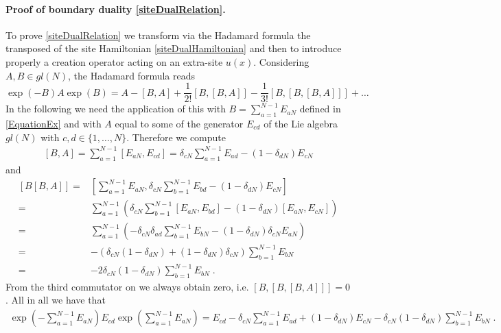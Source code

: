 \documentclass[10pt]{article}
\numberwithin{equation}{section}
\numberwithin{equation}{subsection}
\newcommand{\dt}{\;.}
\begin{document}
 \paragraph{Proof of boundary duality \eqref{siteDualRelation}.} To prove \eqref{siteDualRelation} we transform via the Hadamard formula the transposed of the site Hamiltonian \eqref{siteDualHamiltonian} and then to  introduce properly a creation operator acting on an extra-site $u(x)$. %
 Considering $A,B\in {gl}(N)$, the Hadamard formula reads 
 \begin{equation}\label{HadamardFormula}
     \exp{(-B)}A\exp{(B)}=A-\left[B,A\right]+\frac{1}{2!}\left[B,\left[B,A\right]\right]-\frac{1}{3!}\left[B,\left[B,\left[B,A\right]\right]\right]+\ldots
 \end{equation}
In the following we need the application of this with $B=\sum_{a=1}^{N-1}E_{aN}$ defined in \eqref{EquationEx} and with $A$ equal to some of the generator $E_{cd}$ of the Lie algebra ${gl}(N)$ with $c,d\in\{1,\ldots,N\}$. Therefore we compute 
\begin{align}
	\left[B,A\right]=\sum_{a=1}^{N-1}\left[E_{aN},E_{cd}\right]=\delta_{cN}\sum_{a=1}^{N-1}E_{ad}-(1-\delta_{dN})E_{cN}
\end{align}
and 
\begin{align}
	\left[B\left[B,A\right]\right]=&\left[\sum_{a=1}^{N-1}E_{aN},\delta_{cN}\sum_{b=1}^{N-1}E_{bd}-(1-\delta_{dN})E_{cN}\right]\nonumber\\=&
	\sum_{a=1}^{N-1}\left(\delta_{cN}\sum_{b=1}^{N-1}\left[E_{aN},E_{bd}\right]-(1-\delta_{dN})\left[E_{aN},E_{cN}\right]\right)\nonumber\\=&
	\sum_{a=1}^{N-1}\left(-\delta_{cN}\delta_{ad}\sum_{b=1}^{N-1}E_{bN}-(1-\delta_{dN})\delta_{cN}E_{aN}\right)\nonumber\\=&
	-\left(\delta_{cN}(1-\delta_{dN})+(1-\delta_{dN})\delta_{cN}\right)\sum_{b=1}^{N-1}E_{bN}\nonumber
	\\=&
	-2\delta_{cN}(1-\delta_{dN})\sum_{b=1}^{N-1}E_{bN}\dt
\end{align}
From the third commutator on we always obtain zero, i.e. $[B,[B,[B,A]]]=0$. All in all we have that 
 \begin{align}\label{HT-BA}
 	\exp{\left(-\sum_{a=1}^{N-1}E_{aN}\right)}E_{cd}\exp{\left(\sum_{a=1}^{N-1}E_{aN}\right)}=E_{cd}-\delta_{cN}\sum_{a=1}^{N-1}E_{ad}+(1-\delta_{dN})E_{cN}-\delta_{cN}(1-\delta_{dN})\sum_{b=1}^{N-1}E_{bN}\dt
 \end{align}
\end{document}
